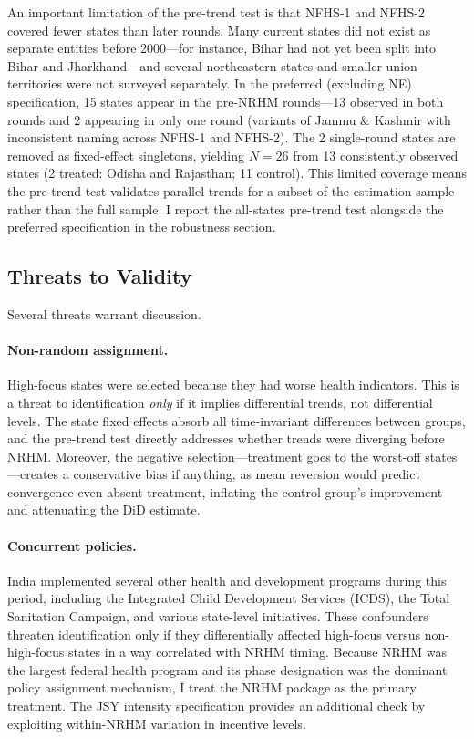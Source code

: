 \documentclass[12pt]{article}
\begin{document}
An important limitation of the pre-trend test is that NFHS-1 and NFHS-2 covered fewer states than later rounds. Many current states did not exist as separate entities before 2000---for instance, Bihar had not yet been split into Bihar and Jharkhand---and several northeastern states and smaller union territories were not surveyed separately. In the preferred (excluding NE) specification, 15 states appear in the pre-NRHM rounds---13 observed in both rounds and 2 appearing in only one round (variants of Jammu \& Kashmir with inconsistent naming across NFHS-1 and NFHS-2). The 2 single-round states are removed as fixed-effect singletons, yielding $N = 26$ from 13 consistently observed states (2 treated: Odisha and Rajasthan; 11 control). This limited coverage means the pre-trend test validates parallel trends for a subset of the estimation sample rather than the full sample. I report the all-states pre-trend test alongside the preferred specification in the robustness section.

\subsection{Threats to Validity}

Several threats warrant discussion.

\paragraph{Non-random assignment.} High-focus states were selected because they had worse health indicators. This is a threat to identification \emph{only} if it implies differential trends, not differential levels. The state fixed effects absorb all time-invariant differences between groups, and the pre-trend test directly addresses whether trends were diverging before NRHM. Moreover, the negative selection---treatment goes to the worst-off states---creates a conservative bias if anything, as mean reversion would predict convergence even absent treatment, inflating the control group's improvement and attenuating the DiD estimate.

\paragraph{Concurrent policies.} India implemented several other health and development programs during this period, including the Integrated Child Development Services (ICDS), the Total Sanitation Campaign, and various state-level initiatives. These confounders threaten identification only if they differentially affected high-focus versus non-high-focus states in a way correlated with NRHM timing. Because NRHM was the largest federal health program and its phase designation was the dominant policy assignment mechanism, I treat the NRHM package as the primary treatment. The JSY intensity specification provides an additional check by exploiting within-NRHM variation in incentive levels.
\end{document}
